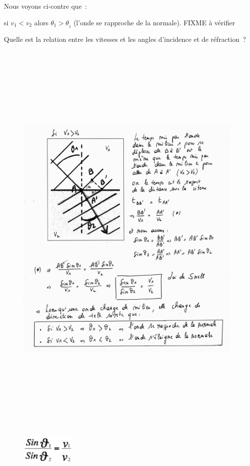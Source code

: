 Nous voyons ci-contre que~:

si $v_1 < v_2$ alors $\theta_1 >  \theta__2$ (l'onde se rapproche de la normale).
FIXME à vérifier

Quelle est la relation entre les vitesses et les angles d'incidence et
de réfraction~?

\begin{figure}
\centering
\includegraphics[width=18.516cm,height=20.461cm]{Pictures/10000001000013080000150A74E0EE61F2B1EE2F.png}
\caption{}
\end{figure}

\begin{figure}
\centering
\includegraphics[width=2.634cm,height=1.412cm]{Pictures/1000000100000045000000258E7A9DA5E900B5EA.png}
\caption{}
\end{figure}

